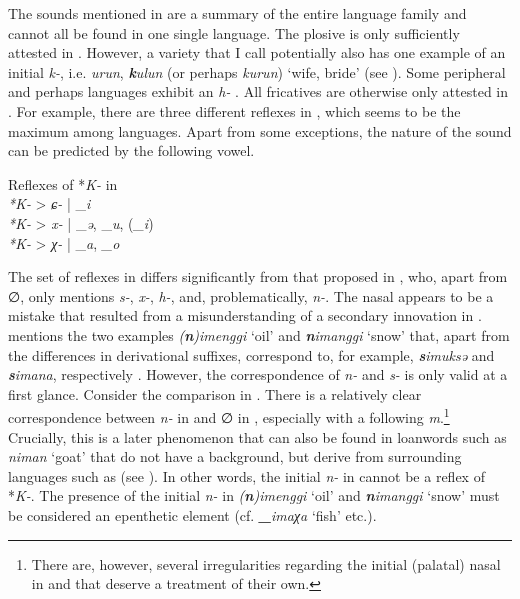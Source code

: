 \documentclass[output=paper,hidelinks]{langscibook}
\begin{document}
The sounds mentioned in  are a summary of the entire language family and cannot all be found in one single language. The plosive is only sufficiently attested in . However, a  variety that I call  potentially also has one example of an initial \textit{k-}, i.e.  \textit{urun},  \textit{\textbf{k}ulun} (or perhaps \textit{kurun}) `wife, bride' (see \citealt{Hölzl2018a, Hölzltoappear}). Some peripheral  and perhaps  languages exhibit an \textit{h-} \citep{Doerfer1973,Kiyose1996,Kiyose2000,Hölzl2017}. All fricatives are otherwise only attested in . For example, there are three different reflexes in , which seems to be the maximum among  languages. Apart from some exceptions, the nature of the sound can be predicted by the following vowel.

\ea\upshape
    \label{ex:2} Reflexes of *\textit{K-} in  \citep[79f.]{AnJun1986}\\
    \textit{*K-} > \textit{ɕ-} | \_\textit{i}\\
    \textit{*K-} > \textit{x-} | \_\textit{ə}, \_\textit{u}, (\textit{\_i})\\
    \textit{*K-} > \textit{χ-} | \_\textit{a}, \textit{\_o}\\
    \z

\noindent The set of reflexes in  differs significantly from that proposed in \citet[41]{Benzing1956}, who, apart from ∅, only mentions \textit{s-}, \textit{x-}, \textit{h-}, and, problematically, \mbox{\textit{n-}.} The nasal appears to be a mistake that resulted from a misunderstanding of a  secondary innovation in . \citet[43]{Benzing1956} mentions the two  examples \textit{(\textbf{n})imenggi} `oil' and \textit{\textbf{n}imanggi} `snow' that, apart from the differences in derivational suffixes, correspond to, for example,  \textit{\textbf{s}imuksə} and \textit{\textbf{s}imana}, respectively \citep{Ikegami1997}. However, the correspondence of \textit{n-} and \textit{s-} is only valid at a first glance. Consider the comparison in . There is a relatively clear correspondence between \textit{n-} in  and ∅ in , especially with a following \textit{m}.\footnote{There are, however, several irregularities regarding the initial (palatal) nasal in  and  that deserve a treatment of their own.} Crucially, this is a later phenomenon that can also be found in loanwords such as \textit{niman} `goat' that do not have a  background, but derive from surrounding languages such as  (see \citealt{Tang2011}). In other words, the initial \textit{n-} in  cannot be a reflex of  *\textit{K-}. The presence of the initial \textit{n-} in \textit{(\textbf{n})imenggi} `oil' and \textit{\textbf{n}imanggi} `snow' must be considered an epenthetic element (cf.  \textit{\textbf{\_}imaχa} `fish' etc.).
\end{document}
